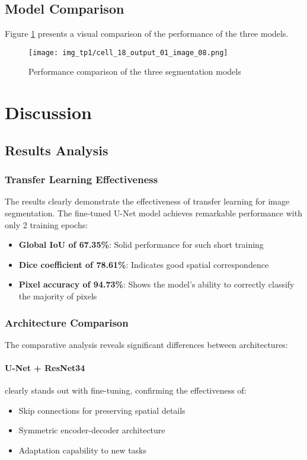 \documentclass[12pt,a4paper]{article}
\begin{document}
\subsection{Model Comparison}

Figure \ref{fig:model_comparison_chart} presents a visual comparison of the performance of the three models.

\begin{figure}[H]
    \centering
    \texttt{[image: img\_tp1/cell\_18\_output\_01\_image\_08.png]}
    \caption{Performance comparison of the three segmentation models}
    \label{fig:model_comparison_chart}
\end{figure}

\section{Discussion}

\subsection{Results Analysis}

\subsubsection{Transfer Learning Effectiveness}

The results clearly demonstrate the effectiveness of transfer learning for image segmentation. The fine-tuned U-Net model achieves remarkable performance with only 2 training epochs:
\begin{itemize}
    \item \textbf{Global IoU of 67.35\%}: Solid performance for such short training
    \item \textbf{Dice coefficient of 78.61\%}: Indicates good spatial correspondence
    \item \textbf{Pixel accuracy of 94.73\%}: Shows the model's ability to correctly classify the majority of pixels
\end{itemize}

\subsubsection{Architecture Comparison}

The comparative analysis reveals significant differences between architectures:

\paragraph{U-Net + ResNet34} clearly stands out with fine-tuning, confirming the effectiveness of:
\begin{itemize}
    \item Skip connections for preserving spatial details
    \item Symmetric encoder-decoder architecture
    \item Adaptation capability to new tasks
\end{itemize}
\end{document}
